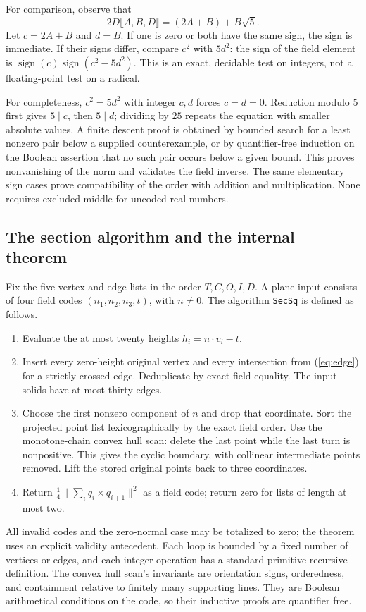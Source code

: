 For comparison, observe that
\[
 2D\llbracket A,B,D\rrbracket=(2A+B)+B\sqrt5.
\]
Let $c=2A+B$ and $d=B$. If one is zero or both have the same sign,
the sign is immediate. If their signs differ, compare $c^2$ with
$5d^2$: the sign of the field element is
$\operatorname{sign}(c)\operatorname{sign}(c^2-5d^2)$.
This is an exact, decidable test on integers, not a floating-point
test on a radical.

For completeness, $c^2=5d^2$ with integer $c,d$ forces $c=d=0$.
Reduction modulo $5$ first gives $5\mid c$, then $5\mid d$; dividing
by $25$ repeats the equation with smaller absolute values. A finite
descent proof is obtained by bounded search for a least nonzero pair
below a supplied counterexample, or by quantifier-free induction on
the Boolean assertion that no such pair occurs below a given bound.
This proves nonvanishing of the norm and validates the field inverse.
The same elementary sign cases prove compatibility of the order with
addition and multiplication. None requires excluded middle for
uncoded real numbers.

\subsection{The section algorithm and the internal theorem}
Fix the five vertex and edge lists in the order $T,C,O,I,D$. A plane
input consists of four field codes $(n_1,n_2,n_3,t)$, with $n\ne0$.
The algorithm \texttt{SecSq} is defined as follows.
\begin{enumerate}
\item Evaluate the at most twenty heights $h_i=n\cdot v_i-t$.
\item Insert every zero-height original vertex and every intersection
from (\ref{eq:edge}) for a strictly crossed edge. Deduplicate by exact
field equality. The input solids have at most thirty edges.
\item Choose the first nonzero component of $n$ and drop that coordinate.
Sort the projected point list lexicographically by the exact field order.
Use the monotone-chain convex hull scan: delete the last point while the
last turn is nonpositive. This gives the cyclic boundary, with collinear
intermediate points removed. Lift the stored original points back to
three coordinates.
\item Return $\tfrac14\|\sum_iq_i\times q_{i+1}\|^2$ as a field code;
return zero for lists of length at most two.
\end{enumerate}
All invalid codes and the zero-normal case may be totalized to zero;
the theorem uses an explicit validity antecedent. Each loop is bounded
by a fixed number of vertices or edges, and each integer operation has
a standard primitive recursive definition. The convex hull scan's
invariants are orientation signs, orderedness, and containment relative
to finitely many supporting lines. They are Boolean arithmetical
conditions on the code, so their inductive proofs are quantifier free.

